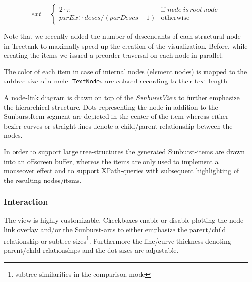 \begin{itemize}
\begin{equation}
ext = \left\{ \begin{array}{cl}
2 \cdot \pi & \textrm{if }node\ is\ root\ node\\
parExt \cdot descs / (parDescs - 1) & \textrm{otherwise}\end{array}\right.
\end{equation}

Note that we recently added the number of descendants of each structural node in Treetank to maximally speed up the creation of the visualization. Before, while creating the items we issued a preorder traversal on each node in parallel.

The color of each item in case of internal nodes (element nodes) is mapped to the subtree-size of a node. \texttt{TextNode}s are colored according to their text-length.

A node-link diagram is drawn on top of the \emph{SunburstView} to further emphasize the hierarchical structure. Dots representing the node in addition to the SunburstItem-segment are depicted in the center of the item whereas either bezier curves or straight lines denote a child/parent-relationship between the nodes.

In order to support large tree-structures the generated Sunburst-items are drawn into an offscreen buffer, whereas the items are only used to implement a mouseover effect and to support XPath-queries with subsequent highlighting of the resulting nodes/items.

\subsubsection{Interaction}
The view is highly customizable. Checkboxes enable or disable plotting the node-link overlay and/or the Sunburst-arcs to either emphasize the parent/child relationship or subtree-sizes\footnote{subtree-similarities in the comparison mode}. Furthermore the line/curve-thickness denoting parent/child relationships and the dot-sizes are adjustable.




\end{itemize}
